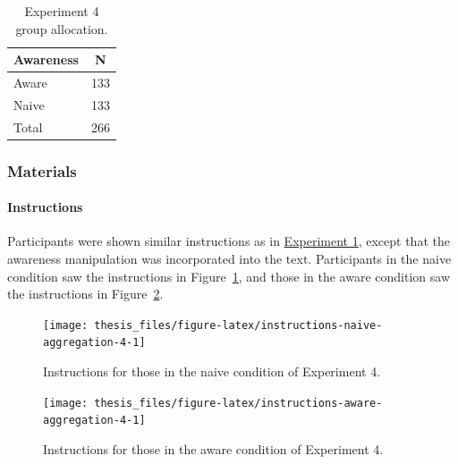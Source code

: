 \documentclass[a4paper, nobind, dvipsnames]{templates/ociamthesis}
\theoremstyle{definition}
\theoremstyle{definition}
\theoremstyle{definition}
\theoremstyle{definition}
\theoremstyle{remark}
\begin{document}
\begin{table}[tbp]

\begin{center}
\begin{threeparttable}

\caption{\label{tab:condition-allocation-aggregation-4}Experiment 4 group allocation.}

\begin{tabular}{ll}
\toprule
Awareness & \multicolumn{1}{c}{N}\\
\midrule
Aware & 133\\
Naive & 133\\
Total & 266\\
\bottomrule
\end{tabular}

\end{threeparttable}
\end{center}

\end{table}

\subsubsection{Materials}

\paragraph{Instructions}

Participants were shown similar instructions as in
\protect\hyperlink{instructions-materials-aggregation-1}{Experiment 1}, except that the awareness
manipulation was incorporated into the text. Participants in the naive condition
saw the instructions in Figure~\ref{fig:instructions-naive-aggregation-4}, and
those in the aware condition saw the instructions in
Figure~\ref{fig:instructions-aware-aggregation-4}.



\begin{figure}
\texttt{[image: thesis\_files/figure-latex/instructions-naive-aggregation-4-1]} \caption{Instructions for those in the naive condition of Experiment 4.}\label{fig:instructions-naive-aggregation-4}
\end{figure}



\begin{figure}
\texttt{[image: thesis\_files/figure-latex/instructions-aware-aggregation-4-1]} \caption{Instructions for those in the aware condition of Experiment 4.}\label{fig:instructions-aware-aggregation-4}
\end{figure}
\end{document}
